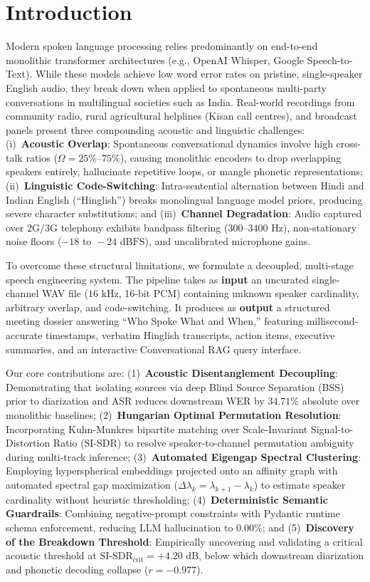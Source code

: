 \documentclass[12pt,a4paper,twocolumn]{article}
\begin{document}
\section{Introduction}
Modern spoken language processing relies predominantly on end-to-end monolithic transformer architectures (e.g., OpenAI Whisper, Google Speech-to-Text). While these models achieve low word error rates on pristine, single-speaker English audio, they break down when applied to spontaneous multi-party conversations in multilingual societies such as India. Real-world recordings from community radio, rural agricultural helplines (Kisan call centres), and broadcast panels present three compounding acoustic and linguistic challenges: (i)~\textbf{Acoustic Overlap}: Spontaneous conversational dynamics involve high cross-talk ratios ($\Omega = 25\%\text{--}75\%$), causing monolithic encoders to drop overlapping speakers entirely, hallucinate repetitive loops, or mangle phonetic representations; (ii)~\textbf{Linguistic Code-Switching}: Intra-sentential alternation between Hindi and Indian English (``Hinglish'') breaks monolingual language model priors, producing severe character substitutions; and (iii)~\textbf{Channel Degradation}: Audio captured over $2\text{G}/3\text{G}$ telephony exhibits bandpass filtering ($300\text{--}3400\text{ Hz}$), non-stationary noise floors ($-18\text{ to }-24\text{ dBFS}$), and uncalibrated microphone gains.

To overcome these structural limitations, we formulate a decoupled, multi-stage speech engineering system. The pipeline takes as \textbf{input} an uncurated single-channel WAV file ($16\text{ kHz}$, 16-bit PCM) containing unknown speaker cardinality, arbitrary overlap, and code-switching. It produces as \textbf{output} a structured meeting dossier answering ``Who Spoke What and When,'' featuring millisecond-accurate timestamps, verbatim Hinglish transcripts, action items, executive summaries, and an interactive Conversational RAG query interface.

Our core contributions are: (1)~\textbf{Acoustic Disentanglement Decoupling}: Demonstrating that isolating sources via deep Blind Source Separation (BSS) prior to diarization and ASR reduces downstream WER by $34.71\%$ absolute over monolithic baselines; (2)~\textbf{Hungarian Optimal Permutation Resolution}: Incorporating Kuhn-Munkres bipartite matching over Scale-Invariant Signal-to-Distortion Ratio (SI-SDR) to resolve speaker-to-channel permutation ambiguity during multi-track inference; (3)~\textbf{Automated Eigengap Spectral Clustering}: Employing hyperspherical embeddings projected onto an affinity graph with automated spectral gap maximization ($\Delta \lambda_k = \lambda_{k+1} - \lambda_k$) to estimate speaker cardinality without heuristic thresholding; (4)~\textbf{Deterministic Semantic Guardrails}: Combining negative-prompt constraints with Pydantic runtime schema enforcement, reducing LLM hallucination to $0.00\%$; and (5)~\textbf{Discovery of the Breakdown Threshold}: Empirically uncovering and validating a critical acoustic threshold at $\text{SI-SDR}_{\text{crit}} = +4.20\text{ dB}$, below which downstream diarization and phonetic decoding collapse ($r = -0.977$).
\end{document}
